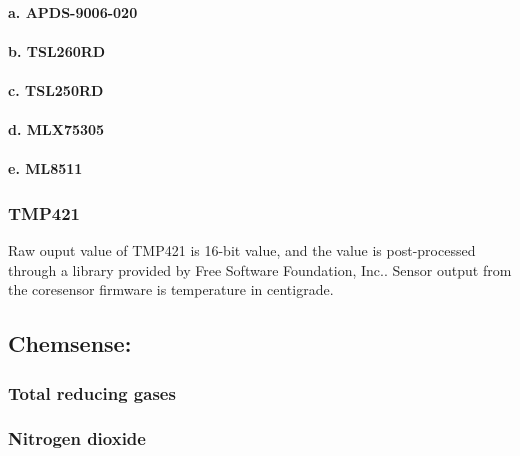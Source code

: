 \paragraph{a. APDS-9006-020}
 
\paragraph{b. TSL260RD}

\paragraph{c. TSL250RD}

\paragraph{d. MLX75305}

\paragraph{e. ML8511}


\subsubsection{ TMP421}

Raw ouput value of TMP421 is 16-bit value, and the value is post-processed through a library provided by Free Software Foundation, Inc.. Sensor output from the coresensor firmware is temperature in centigrade.


\subsection{Chemsense:}
\subsubsection{ Total reducing gases}

\subsubsection{ Nitrogen dioxide}

